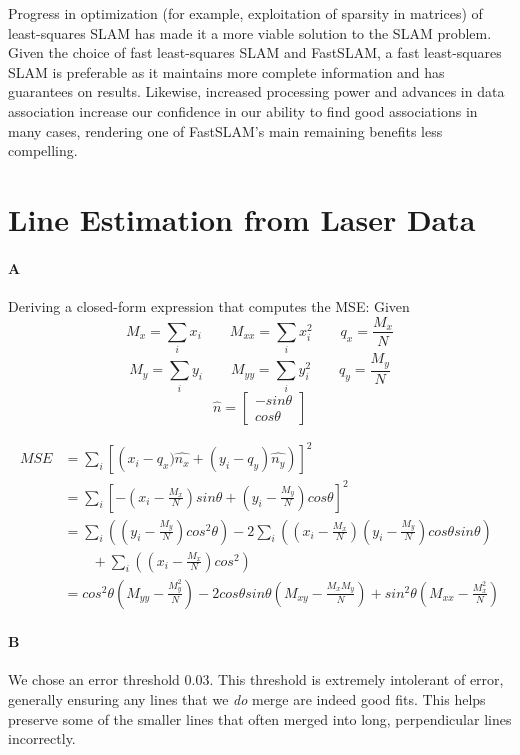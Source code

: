 \documentclass[12pt]{article}
\begin{document}
Progress in optimization (for example, exploitation of sparsity in matrices) of least-squares
SLAM has made it a more viable solution to the SLAM problem. Given the choice of fast
least-squares SLAM and FastSLAM, a fast least-squares SLAM is preferable as it maintains
more complete information and has guarantees on results. Likewise, increased processing
power and advances in data association increase our confidence in our ability to find
good associations in many cases, rendering one of FastSLAM's main remaining benefits
less compelling.

\section{Line Estimation from Laser Data}

\paragraph{A}Deriving a closed-form expression that computes the MSE:
Given
$$M_x = \displaystyle\sum_i x_i \qquad M_{xx} = \displaystyle\sum_i x_i^2 \qquad q_x = \frac{M_x}{N}$$
$$M_y = \displaystyle\sum_i y_i \qquad M_{yy} = \displaystyle\sum_i y_i^2 \qquad q_y = \frac{M_y}{N}$$
 $$\hat{n} = \left[ \begin{array}{c}
-sin\theta \\
cos\theta
\end{array}\right]$$

\begin{align*} MSE &=  \displaystyle\sum_i \left[\left(x_i - q_x)\hat{n_x} + (y_i - q_y)\hat{n_y}\right)\right]^2\\
&=\displaystyle\sum_i \left[-\left(x_i - \frac{M_x}{N}\right)sin\theta + \left(y_i - \frac{M_y}{N}\right)cos\theta\right]^2 \\
&=\displaystyle\sum_i \left(\left(y_i - \frac{M_y}{N}\right)cos^2\theta \right)
-2\displaystyle\sum_i \left(\left(x_i-\frac{M_x}{N}\right)\left(y_i - \frac{M_y}{N}\right)cos\theta sin\theta\right) \\
 &\qquad+ \displaystyle\sum_i \left(\left(x_i - \frac{M_x}{N}\right)cos^2\right) \\
&= cos^2\theta(M_{yy}-\frac{M_y^2}{N}) - 2cos\theta sin\theta(M_{xy}-\frac{M_xM_y}{N}) + sin^2\theta(M_{xx}-\frac{M_x^2}{N})
\end{align*}

\paragraph{B}
We chose an error threshold $0.03$. This threshold is extremely intolerant of error,
generally ensuring any lines that we \emph{do} merge are indeed good fits. This helps
preserve some of the smaller lines that often merged into long, perpendicular lines
incorrectly.
\end{document}
